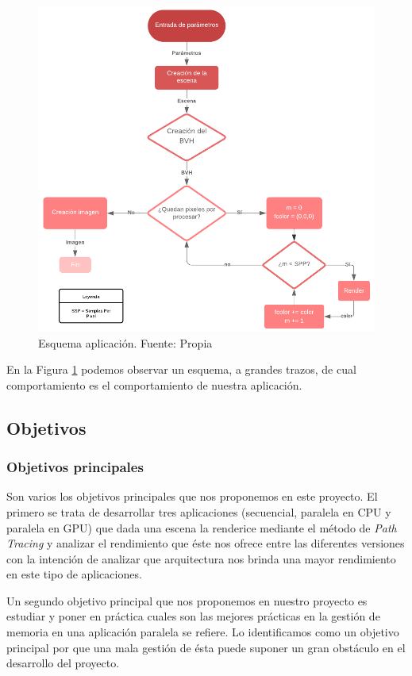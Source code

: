 \documentclass[titlepage,12pt]{report}
\begin{document}
\begin{figure}[ht]
	\centering
	\includegraphics[scale=0.35]{media/Esquema.png}
	\caption{Esquema aplicación. Fuente: Propia}
	\label{Esquema}
\end{figure}

En la Figura \ref{Esquema} podemos observar un esquema, a grandes trazos, de cual comportamiento es el comportamiento de nuestra aplicación.

\subsection{Objetivos}

\subsubsection{Objetivos principales}

Son varios los objetivos principales que nos proponemos en este proyecto. El primero se trata de desarrollar tres aplicaciones (secuencial, paralela en CPU y paralela en GPU) que dada una escena la renderice mediante el método de \textit{Path Tracing} y analizar el rendimiento que éste nos ofrece entre las diferentes versiones con la intención de analizar que arquitectura nos brinda una mayor rendimiento en este tipo de aplicaciones.

Un segundo objetivo principal que nos proponemos en nuestro proyecto es estudiar y poner en práctica cuales son las mejores prácticas en la gestión de memoria en una aplicación paralela se refiere. Lo identificamos como un objetivo principal por que una mala gestión de ésta puede suponer un gran obstáculo en el desarrollo del proyecto.
\end{document}

